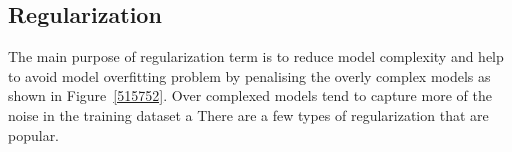 \subsection{Regularization}

The main purpose of regularization term is to reduce model complexity and help to avoid model overfitting problem by penalising the overly complex models as shown in Figure~\ref{515752}. Over complexed models tend to capture more of the noise in the training dataset a There are a few types of regularization that are popular. 